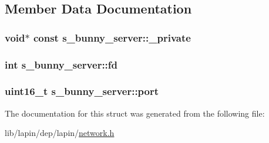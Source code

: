 \subsection{Member Data Documentation}
\hypertarget{structs__bunny__server_a66cb479387a6cbd7f9b2954a3c64579c}{
\subsubsection[{\-\_\-private}]{ void$\ast$ {\bf const} s\-\_\-bunny\-\_\-server\-::\-\_\-private}}\label{structs__bunny__server_a66cb479387a6cbd7f9b2954a3c64579c}
\hypertarget{structs__bunny__server_a8a91cc2ee72f2ed3c1efb38bbb01fd5d}{
\subsubsection[{fd}]{ {\bf int} s\-\_\-bunny\-\_\-server\-::fd}}\label{structs__bunny__server_a8a91cc2ee72f2ed3c1efb38bbb01fd5d}
\hypertarget{structs__bunny__server_af9fb77d1cc6e9fcd78094e1ea90873d0}{
\subsubsection[{port}]{ uint16\-\_\-t s\-\_\-bunny\-\_\-server\-::port}}\label{structs__bunny__server_af9fb77d1cc6e9fcd78094e1ea90873d0}


The documentation for this struct was generated from the following file\-:\begin{DoxyCompactItemize}
\item 
lib/lapin/dep/lapin/\hyperlink{network_8h}{network.\-h}\end{DoxyCompactItemize}
